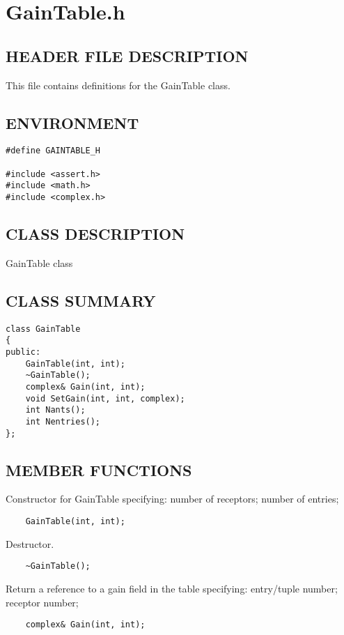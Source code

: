 \clearpage
\section{GainTable.h}

\subsection*{HEADER FILE DESCRIPTION}
 This file contains definitions for the GainTable class.
  
\subsection*{ENVIRONMENT}
\begin{verbatim}
#define GAINTABLE_H

#include <assert.h>
#include <math.h>
#include <complex.h>
\end{verbatim}

\subsection*{CLASS DESCRIPTION}
GainTable class

\subsection*{CLASS SUMMARY}
\begin{verbatim}
class GainTable
{
public:
    GainTable(int, int);
    ~GainTable();
    complex& Gain(int, int);
    void SetGain(int, int, complex);
    int Nants();
    int Nentries();
};
\end{verbatim}

\subsection*{MEMBER FUNCTIONS}
      
       Constructor for GainTable specifying:
         number of receptors;
         number of entries;
\begin{verbatim}
    GainTable(int, int);
\end{verbatim}

       Destructor.
\begin{verbatim}
    ~GainTable();
\end{verbatim}
      
       Return a reference to a gain field in the table specifying:
         entry/tuple number;
         receptor number;
\begin{verbatim}
    complex& Gain(int, int);
\end{verbatim}
      
